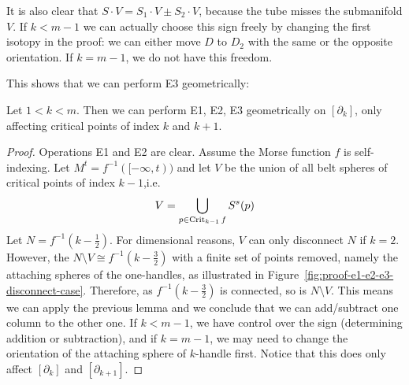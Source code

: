 \begin{remark}
    It is also clear that $S\cdot V = S_1\cdot V \pm S_2 \cdot V$, because the tube misses the submanifold $V$.
    If $k < m-1$ we can actually choose this sign freely by changing the first isotopy in the proof: we can either move $D$ to $ D_2$ with the same or the opposite orientation. If $k = m-1$, we do not have this freedom.
\end{remark}

This shows that we can perform E3 geometrically:
\begin{theorem}
    Let $1 < k < m$. Then we can perform E1, E2, E3 geometrically on $[\partial_k]$, only affecting critical points of index $k$ and $k+1$.
\end{theorem}
\begin{proof}
    Operations E1 and E2 are clear.
    Assume the Morse function $f$ is self-indexing.
    Let  $M^{t} = f^{-1}([-\infty, t))$ and let $V$ be the union of all belt spheres of critical points of index $k-1$,i.e. \[
        V = \bigcup_{p \in \operatorname{Crit}_{k-1} f} S^{s}(p)
    \]
    Let $N = f^{-1}(k - \frac{1}{2})$.
    For dimensional reasons, $V$ can only disconnect $N$ if  $k = 2$.
    However, the $N \setminus V \cong f^{-1}(k - \frac{3}{2})$ with a finite set of points removed, namely the attaching spheres of the one-handles, as illustrated in Figure~\ref{fig:proof-e1-e2-e3-disconnect-case}.
    Therefore, as $f^{-1}(k- \frac{3}{2})$ is connected, so is $N \setminus V$.
    This means we can apply the previous lemma and we conclude that we can add/subtract one column to the other one.
    If $k < m-1$, we have control over the sign (determining addition or subtraction), and if $k = m-1$, we may need to change the orientation of the attaching sphere of  $k$-handle first.
    Notice that this does only affect $[\partial_k]$ and $[\partial_{k+1}]$.
\end{proof}

